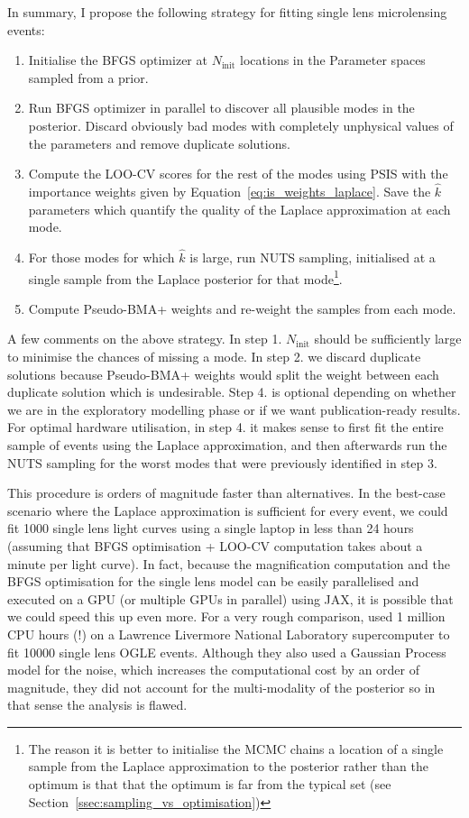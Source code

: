 \documentclass[12pt,dvipsnames]{report}
\newcommand{\ssf}[1]{\textsf{#1}}
\begin{document}
In summary, I propose the following strategy for fitting single lens 
microlensing events:
\begin{enumerate}
    \item Initialise the BFGS optimizer at $N_\mathrm{init}$ locations in the Parameter
    spaces sampled from a prior. 
    \item Run BFGS optimizer in parallel to discover all plausible modes in the 
    posterior. Discard obviously bad modes with completely unphysical values of 
    the parameters and remove duplicate solutions.
    \item Compute the LOO-CV scores for the rest of the modes using PSIS with the 
    importance weights given by Equation~\ref{eq:is_weights_laplace}. Save the $\hat k$ 
    parameters which quantify the quality of the Laplace approximation at each mode.
    \item For those modes for which $\hat k$ is large, run NUTS sampling, initialised 
    at a single sample from the Laplace posterior for that mode\footnote{The reason it
    is better to initialise the MCMC chains a location of a single sample
    from the Laplace approximation to the posterior rather than the optimum is that 
    that the optimum is far from the typical set 
    (see Section~\ref{ssec:sampling_vs_optimisation})}.
    \item Compute Pseudo-BMA+ weights and re-weight the samples from each mode.
\end{enumerate}
A few comments on the above strategy.
In step 1. $N_\mathrm{init}$ should be sufficiently  large to minimise the chances of 
missing a mode. In step 2. we discard duplicate solutions because Pseudo-BMA+ 
weights would split the weight between each duplicate solution which is undesirable. 
Step 4. is optional depending on whether we are in the exploratory modelling phase or 
if we want publication-ready results. For optimal hardware utilisation, in step 4. 
it makes  sense to first fit the entire sample  of events using the Laplace 
approximation, and then afterwards run the NUTS sampling for the worst modes 
that were previously identified in step 3.

This procedure is orders of magnitude faster than alternatives. 
In the best-case scenario where the Laplace approximation is sufficient for every event,
we could fit 1000 single lens light curves using a single laptop in less than 
24 hours (assuming that BFGS optimisation + LOO-CV computation takes about a 
minute per light curve). In fact, because the magnification computation and the BFGS
optimisation for the single lens model can be easily parallelised and executed on a
GPU (or multiple GPUs in parallel) using \ssf{JAX}, it is possible that we could 
speed this up even more. 
For a very rough comparison, \citep{golovich2022} used 1 million CPU hours (!) on a 
Lawrence Livermore National Laboratory supercomputer to fit 10000 single lens 
OGLE events. Although they also used a Gaussian Process model for the noise, which 
increases the computational cost by an order of magnitude, they did not account 
for the multi-modality of the posterior so in that sense the analysis is flawed.
\end{document}
